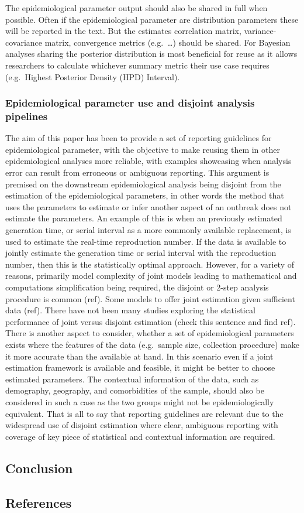 \documentclass[
  10pt,
  letterpaper,
]{article}
\begin{document}
The epidemiological parameter output should also be shared in full when
possible. Often if the epidemiological parameter are distribution
parameters these will be reported in the text. But the estimates
correlation matrix, variance-covariance matrix, convergence metrics
(e.g.~\ldots) should be shared. For Bayesian analyses sharing the
posterior distribution is most beneficial for reuse as it allows
researchers to calculate whichever summary metric their use case
requires (e.g.~Highest Posterior Density (HPD) Interval).

\subsubsection{Epidemiological parameter use and disjoint analysis
pipelines}\label{epidemiological-parameter-use-and-disjoint-analysis-pipelines}

The aim of this paper has been to provide a set of reporting guidelines
for epidemiological parameter, with the objective to make reusing them
in other epidemiological analyses more reliable, with examples
showcasing when analysis error can result from erroneous or ambiguous
reporting. This argument is premised on the downstream epidemiological
analysis being disjoint from the estimation of the epidemiological
parameters, in other words the method that uses the parameters to
estimate or infer another aspect of an outbreak does not estimate the
parameters. An example of this is when an previously estimated
generation time, or serial interval as a more commonly available
replacement, is used to estimate the real-time reproduction number. If
the data is available to jointly estimate the generation time or serial
interval with the reproduction number, then this is the statistically
optimal approach. However, for a variety of reasons, primarily model
complexity of joint models leading to mathematical and computations
simplification being required, the disjoint or 2-step analysis procedure
is common (ref). Some models to offer joint estimation given sufficient
data (ref). There have not been many studies exploring the statistical
performance of joint versus disjoint estimation (check this sentence and
find ref). There is another aspect to consider, whether a set of
epidemiological parameters exists where the features of the data
(e.g.~sample size, collection procedure) make it more accurate than the
available at hand. In this scenario even if a joint estimation framework
is available and feasible, it might be better to choose estimated
parameters. The contextual information of the data, such as demography,
geography, and comorbidities of the sample, should also be considered in
such a case as the two groups might not be epidemiologically equivalent.
That is all to say that reporting guidelines are relevant due to the
widespread use of disjoint estimation where clear, ambiguous reporting
with coverage of key piece of statistical and contextual information are
required.

\subsection{Conclusion}\label{conclusion}

\subsection{References}\label{references}


\nolinenumbers
  
\end{document}
